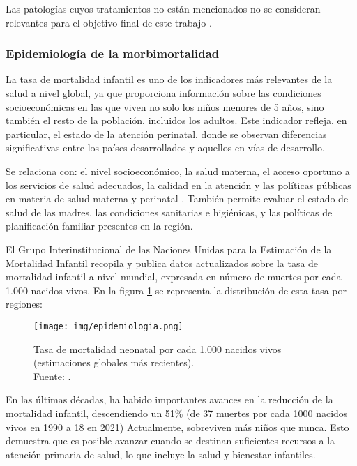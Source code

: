 Las patologías cuyos tratamientos no están mencionados no se consideran relevantes para el objetivo final de este trabajo \cite{rellan2008prematuro}.

\subsubsection{Epidemiología de la morbimortalidad}

La tasa de mortalidad infantil es uno de los indicadores más relevantes de la salud a nivel global, ya que proporciona información sobre las condiciones socioeconómicas en las que viven no solo los niños menores de 5 años, sino también el resto de la población, incluidos los adultos. Este indicador refleja, en particular, el estado de la atención perinatal, donde se observan diferencias significativas entre los países desarrollados y aquellos en vías de desarrollo.

Se relaciona con: el nivel socioeconómico, la salud materna, el acceso oportuno a los servicios de salud adecuados, la calidad en la atención y las políticas públicas en materia de salud materna y perinatal \cite{santesteban2012mortalidad}. También permite evaluar el estado de salud de las madres, las condiciones sanitarias e higiénicas, y las políticas de planificación familiar presentes en la región.

El Grupo Interinstitucional de las Naciones Unidas para la Estimación de la Mortalidad Infantil recopila y publica datos actualizados sobre la tasa de mortalidad infantil a nivel mundial, expresada en número de muertes por cada 1.000 nacidos vivos.  En la figura \ref{fig:epidemiologia} se representa la distribución de esta tasa por regiones:

\begin{figure}[H]
    \centering
    \texttt{[image: img/epidemiologia.png]}
    \caption{Tasa de mortalidad neonatal por cada 1.000 nacidos vivos (estimaciones globales más recientes). 
    \\ Fuente: \cite{unigme2024}.}
    \label{fig:epidemiologia}
\end{figure}

En las últimas décadas, ha habido importantes avances en la reducción de la mortalidad infantil, descendiendo un 51\% (de 37 muertes por cada 1000 nacidos vivos en 1990 a 18 en 2021) Actualmente, sobreviven más niños que nunca. Esto demuestra que es posible avanzar cuando se destinan suficientes recursos a la atención primaria de salud, lo que incluye la salud y bienestar infantiles.

